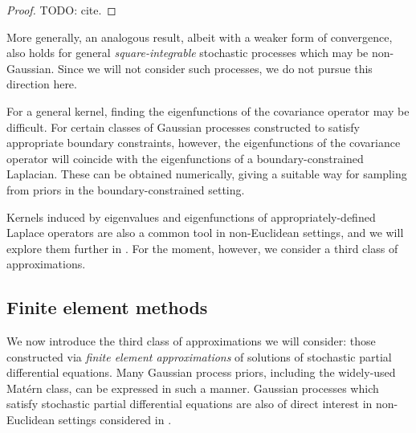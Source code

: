 \documentclass[11pt]{book}
\begin{document}
\begin{proof}
TODO: cite.
\end{proof}

More generally, an analogous result, albeit with a weaker form of convergence, also holds for general \emph{square-integrable} stochastic processes which may be non-Gaussian.
Since we will not consider such processes, we do not pursue this direction here.

For a general kernel, finding the eigenfunctions of the covariance operator may be difficult.
For certain classes of Gaussian processes constructed to satisfy appropriate boundary constraints, however, the eigenfunctions of the covariance operator will coincide with the eigenfunctions of a boundary-constrained Laplacian.
These can be obtained numerically, giving a suitable way for sampling from priors in the boundary-constrained setting.

Kernels induced by eigenvalues and eigenfunctions of appropriately-defined Laplace operators are also a common tool in non-Euclidean settings, and we will explore them further in .
For the moment, however, we consider a third class of approximations.

\subsection{Finite element methods}

We now introduce the third class of approximations we will consider: those constructed via \emph{finite element approximations} of solutions of stochastic partial differential equations.
Many Gaussian process priors, including the widely-used Matérn class, can be expressed in such a manner.
Gaussian processes which satisfy stochastic partial differential equations are also of direct interest in non-Euclidean settings considered in .
\end{document}
